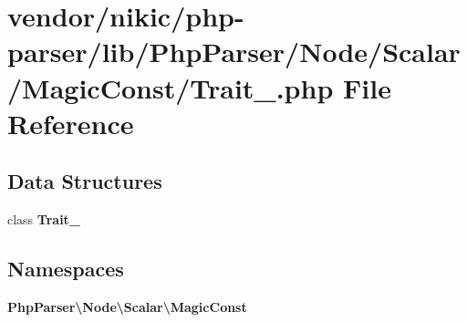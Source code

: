 \section{vendor/nikic/php-\/parser/lib/\+Php\+Parser/\+Node/\+Scalar/\+Magic\+Const/\+Trait\+\_\+.php File Reference}
\label{_node_2_scalar_2_magic_const_2_trait___8php}
\subsection*{Data Structures}
\begin{DoxyCompactItemize}
\item 
class {\bf Trait\+\_\+}
\end{DoxyCompactItemize}
\subsection*{Namespaces}
\begin{DoxyCompactItemize}
\item 
 {\bf Php\+Parser\textbackslash{}\+Node\textbackslash{}\+Scalar\textbackslash{}\+Magic\+Const}
\end{DoxyCompactItemize}
